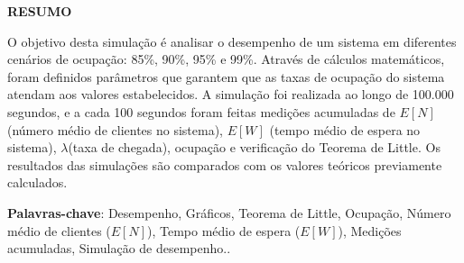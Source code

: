 \begin{center}
    \textbf{RESUMO}
\end{center}

O objetivo desta simulação é analisar o desempenho de um sistema em diferentes cenários de ocupação: 85\%, 90\%, 95\% e 99\%. Através de cálculos matemáticos, foram definidos parâmetros que garantem que as taxas de ocupação do sistema atendam aos valores estabelecidos. A simulação foi realizada ao longo de 100.000 segundos, e a cada 100 segundos foram feitas medições acumuladas de $E[N]$ (número médio de clientes no sistema), $E[W]$ (tempo médio de espera no sistema), $\lambda$(taxa de chegada), ocupação e verificação do Teorema de Little. Os resultados das simulações são comparados com os valores teóricos previamente calculados.

\vspace{2ex}

\textbf{Palavras-chave}: Desempenho, Gráficos, Teorema de Little, Ocupação, Número médio de clientes ($E[N]$), Tempo médio de espera ($E[W]$), Medições acumuladas, Simulação de desempenho..
